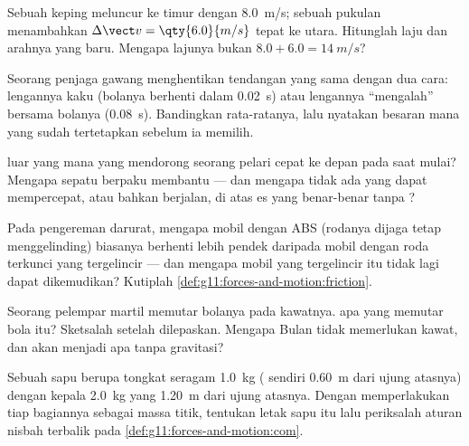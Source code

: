 \begin{exercise}[$\star\star$]\label{exo:g11:forces-and-motion:7}
Sebuah keping meluncur ke timur dengan \qty{8.0}{m/s}; sebuah pukulan
menambahkan $\Delta \vect v = \qty{6.0}{m/s}$ tepat ke utara. Hitunglah
laju dan arahnya yang baru. Mengapa lajunya bukan
$8.0 + 6.0 = \qty{14}{m/s}$?
\end{exercise}

\begin{exercise}[$\star\star$]\label{exo:g11:forces-and-motion:8}
Seorang penjaga gawang menghentikan tendangan yang sama dengan dua
cara: lengannya kaku (bolanya berhenti dalam \qty{0.02}{s}) atau
lengannya ``mengalah'' bersama bolanya (\qty{0.08}{s}). Bandingkan 
rata-ratanya, lalu nyatakan besaran mana yang sudah tertetapkan sebelum
ia memilih.
\end{exercise}

\begin{exercise}[$\star\star$]\label{exo:g11:forces-and-motion:9}
 luar yang mana yang mendorong seorang pelari cepat ke depan pada
saat mulai? Mengapa sepatu berpaku membantu --- dan mengapa tidak ada
yang dapat mempercepat, atau bahkan berjalan, di atas es yang
benar-benar tanpa ?
\end{exercise}

\begin{exercise}[$\star\star$]\label{exo:g11:forces-and-motion:10}
Pada pengereman darurat, mengapa mobil dengan ABS (rodanya dijaga tetap
menggelinding) biasanya berhenti lebih pendek daripada mobil dengan roda
terkunci yang tergelincir --- dan mengapa mobil yang tergelincir itu
tidak lagi dapat dikemudikan? Kutiplah
\cref{def:g11:forces-and-motion:friction}.
\end{exercise}

\begin{exercise}[$\star\star$]\label{exo:g11:forces-and-motion:11}
Seorang pelempar martil memutar bolanya pada kawatnya.  apa yang
memutar bola itu? Sketsalah  setelah dilepaskan. Mengapa
Bulan tidak memerlukan kawat, dan  akan menjadi apa tanpa
gravitasi?
\end{exercise}

\begin{exercise}[$\star\star\star$]\label{exo:g11:forces-and-motion:12}
Sebuah sapu berupa tongkat seragam \qty{1.0}{kg} (
sendiri \qty{0.60}{m} dari ujung atasnya) dengan kepala \qty{2.0}{kg}
yang  \qty{1.20}{m} dari ujung atasnya. Dengan
memperlakukan tiap bagiannya sebagai massa titik, tentukan letak  sapu itu lalu periksalah aturan nisbah terbalik pada
\cref{def:g11:forces-and-motion:com}.
\end{exercise}

